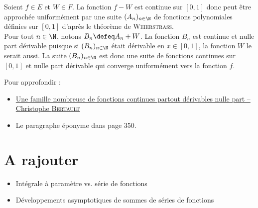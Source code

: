 \begin{preuve}
    Soient $f \in E$ et $W \in F$. La fonction $f - W$ est continue sur $[0, 1]$ donc peut être approchée uniformément par une suite $(A_n)_{n \in \N}$ de fonctions polynomiales définies sur $[0, 1]$ d'après le théorème de \textsc{Weierstrass}. \\
    Pour tout $n \in \N$, notons $B_n \defeq A_n + W$. La fonction $B_n$ est continue et nulle part dérivable puisque si $(B_n)_{n \in \N}$ était dérivable en $x \in [0, 1]$, la fonction $W$ le serait aussi. La suite $(B_n)_{n \in \N}$ est donc une suite de fonctions continues sur $[0,1]$ et nulle part dérivable qui converge uniformément vers la fonction $f$.
\end{preuve}

Pour approfondir : 
\begin{itemize}
    \item \href{http://christophebertault.fr/documents/articles/Article - Une famille nombreuse de fonctions continues partout derivables nulle part.pdf}{Une famille nombreuse de fonctions continues partout dérivables nulle part -- Christophe \textsc{Bertault}}
    \item Le paragraphe éponyme dans \cite{contre-exemples} page 350.
\end{itemize}

\section{A rajouter}

\begin{itemize}
    \item Intégrale à paramètre vs. série de fonctions
    \item Développements asymptotiques de sommes de séries de fonctions
    \end{itemize}
    